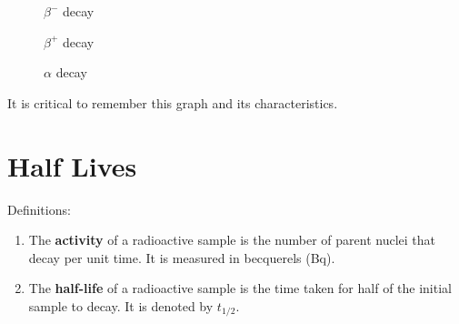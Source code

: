 \documentclass[a4paper,12pt]{article}
\let\oldsection\section
\renewcommand\section{\clearpage\oldsection}
\begin{document}
\begin{enumerate}
        \begin{minipage}{0.3\textwidth}
          \begin{figure}[H]
            \centering
            \caption{$\beta^-$ decay}
          \end{figure}
        \end{minipage}%
        \begin{minipage}{0.3\textwidth}
          \begin{figure}[H]
            \centering
            \caption{$\beta^+$ decay}
          \end{figure}
        \end{minipage}%
        \begin{minipage}{0.3\textwidth}
          \begin{figure}[H]
            \centering
            \caption{$\alpha$ decay}
          \end{figure}
        \end{minipage}
\end{enumerate}
It is critical to remember this graph and its characteristics.

\section{Half Lives}

Definitions:
\begin{enumerate}
  \item The \textbf{activity} of a radioactive sample is the number of parent nuclei that decay per unit time. It is measured in becquerels (Bq).
  \item The \textbf{half-life} of a radioactive sample is the time taken for half of the initial sample to decay. It is denoted by $t_{1/2}$.
\end{enumerate}
\end{document}
